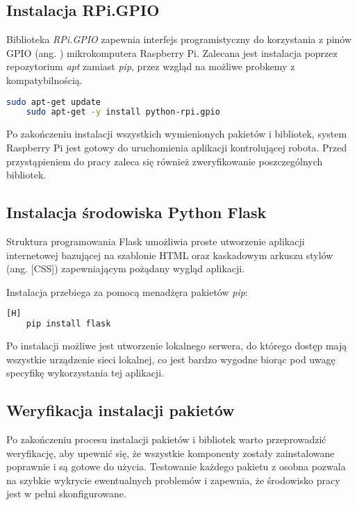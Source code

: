 \subsection{Instalacja RPi.GPIO}
Biblioteka \textit{RPi.GPIO} zapewnia interfejs programistyczny do korzystania z pinów GPIO (ang. ) mikrokomputera Raspberry Pi. Zalecana jest instalacja poprzez repozytorium \textit{apt} zamiast \textit{pip}, przez wzgląd na możliwe probkemy z kompatybilnością.

\begin{lstlisting}[language=bash]
    sudo apt-get update
    sudo apt-get -y install python-rpi.gpio
\end{lstlisting}

\vspace*{1cm}

Po zakończeniu instalacji wszystkich wymienionych pakietów i bibliotek, system Raspberry Pi jest gotowy do uruchomienia aplikacji kontrolującej robota. Przed przystąpieniem do pracy zaleca się również zweryfikowanie poszczególnych bibliotek.

\subsection{Instalacja środowiska Python Flask}

Struktura programowania Flask umożliwia proste utworzenie aplikacji internetowej bazującej na szablonie HTML oraz kaskadowym arkuszu stylów (ang.  [CSS]) zapewniającym pożądany wygląd aplikacji. 

Instalacja przebiega za pomocą menadżęra pakietów \textit{pip}:

\begin{lstlisting}[language=bash][H]
    pip install flask
\end{lstlisting}

Po instalacji możliwe jest utworzenie lokalnego serwera, do którego dostęp mają wszystkie urządzenie sieci lokalnej, co jest bardzo wygodne biorąc pod uwagę specyfikę wykorzystania tej aplikacji. 

\subsection{Weryfikacja instalacji pakietów}

Po zakończeniu procesu instalacji pakietów i bibliotek warto przeprowadzić weryfikację, aby upewnić się, że wszystkie komponenty zostały zainstalowane poprawnie i są gotowe do użycia. Testowanie każdego pakietu z osobna pozwala na szybkie wykrycie ewentualnych problemów i zapewnia, że środowisko pracy jest w pełni skonfigurowane.

